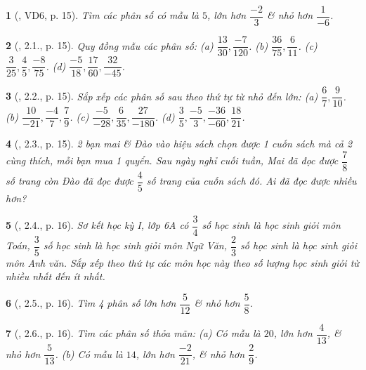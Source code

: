 \documentclass{article}
\newtheorem{baitoan}{}
\begin{document}
\begin{baitoan}[\cite{Binh_boi_duong_Toan_6_tap_2}, VD6, p. 15]
	Tìm các phân số có mẫu là $5$, lớn hơn $\dfrac{-2}{3}$ \& nhỏ hơn $\dfrac{1}{-6}$.
\end{baitoan}

\begin{baitoan}[\cite{Binh_boi_duong_Toan_6_tap_2}, 2.1., p. 15]
	Quy đồng mẫu các phân số: (a) $\dfrac{13}{30},\dfrac{-7}{120}$. (b) $\dfrac{36}{75},\dfrac{6}{11}$. (c) $\dfrac{3}{25},\dfrac{4}{5},\dfrac{-8}{75}$. (d) $\dfrac{-5}{18},\dfrac{17}{60},\dfrac{32}{-45}$.
\end{baitoan}

\begin{baitoan}[\cite{Binh_boi_duong_Toan_6_tap_2}, 2.2., p. 15]
	Sắp xếp các phân số sau theo thứ tự từ nhỏ đến lớn: (a) $\dfrac{6}{7},\dfrac{9}{10}$. (b) $\dfrac{10}{-21},\dfrac{-4}{7},\dfrac{7}{9}$. (c) $\dfrac{-5}{-28},\dfrac{6}{35},\dfrac{27}{-180}$. (d) $\dfrac{3}{5},\dfrac{-5}{3},\dfrac{-36}{-60},\dfrac{18}{21}$.
\end{baitoan}

\begin{baitoan}[\cite{Binh_boi_duong_Toan_6_tap_2}, 2.3., p. 15]
	2 bạn mai \& Đào vào hiệu sách chọn được 1 cuốn sách mà cả 2 cùng thích, mỗi bạn mua 1 quyển. Sau ngày nghỉ cuối tuần, Mai đã đọc được $\dfrac{7}{8}$ số trang còn Đào đã đọc được $\dfrac{4}{5}$ số trang của cuốn sách đó. Ai đã đọc được nhiều hơn?
\end{baitoan}

\begin{baitoan}[\cite{Binh_boi_duong_Toan_6_tap_2}, 2.4., p. 16]
	Sơ kết học kỳ I, lớp 6A có $\dfrac{3}{4}$ số học sinh là học sinh giỏi môn Toán, $\dfrac{3}{5}$ số học sinh là học sinh giỏi môn Ngữ Văn, $\dfrac{2}{3}$ số học sinh là học sinh giỏi môn Anh văn. Sắp xếp theo thứ tự các môn học này theo số lượng học sinh giỏi từ nhiều nhất đến ít nhất.
\end{baitoan}

\begin{baitoan}[\cite{Binh_boi_duong_Toan_6_tap_2}, 2.5., p. 16]
	Tìm 4 phân số lớn hơn $\dfrac{5}{12}$ \& nhỏ hơn $\dfrac{5}{8}$.
\end{baitoan}

\begin{baitoan}[\cite{Binh_boi_duong_Toan_6_tap_2}, 2.6., p. 16]
	Tìm các phân số thỏa mãn: (a) Có mẫu là $20$, lớn hơn $\dfrac{4}{13}$, \& nhỏ hơn $\dfrac{5}{13}$. (b) Có mẫu là $14$, lớn hơn $\dfrac{-2}{21}$, \& nhỏ hơn $\dfrac{2}{9}$.
\end{baitoan}
\end{document}
